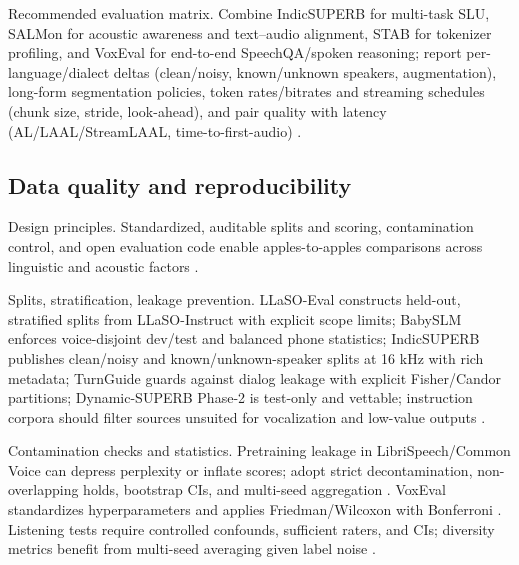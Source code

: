 \documentclass{article}
\begin{document}
Recommended evaluation matrix. Combine IndicSUPERB for multi-task SLU, SALMon for acoustic awareness and text--audio alignment, STAB for tokenizer profiling, and VoxEval for end-to-end SpeechQA/spoken reasoning; report per-language/dialect deltas (clean/noisy, known/unknown speakers, augmentation), long-form segmentation policies, token rates/bitrates and streaming schedules (chunk size, stride, look-ahead), and pair quality with latency (AL/LAAL/StreamLAAL, time-to-first-audio) \cite{entry2025indicsuperbspeechprocessinguniversalperf,maimon2025salmonsuiteacousticlanguagemodelevaluati,vashishth2024stabspeechtokenizerassessmentbenchmark,cui2025voxevalbenchmarkingknowledgeunderstandin,zhang2025impactframeratesspeechtokenizercasestudy}.

\subsection{Data quality and reproducibility} \label{subsec:dataqualityandreproducibility}

Design principles. Standardized, auditable splits and scoring, contamination control, and open evaluation code enable apples-to-apples comparisons across linguistic and acoustic factors \cite{entry2025indicsuperbspeechprocessinguniversalperf,maimon2025salmonsuiteacousticlanguagemodelevaluati}.

Splits, stratification, leakage prevention. LLaSO-Eval constructs held-out, stratified splits from LLaSO-Instruct with explicit scope limits; BabySLM enforces voice-disjoint dev/test and balanced phone statistics; IndicSUPERB publishes clean/noisy and known/unknown-speaker splits at 16 kHz with rich metadata; TurnGuide guards against dialog leakage with explicit Fisher/Candor partitions; Dynamic-SUPERB Phase-2 is test-only and vettable; instruction corpora should filter sources unsuited for vocalization and low-value outputs \cite{sun2025llasofoundationalframeworkreproduciblere,lavechin2023babyslmlanguageacquisitionfriendlybenchm,cui2025thinkbeforeyoutalkenhancingmeaningfuldia,huang2025dynamicsuperbphase2collaborativelyexpand,shu2023llasmlargelanguagespeechmodel}.

Contamination checks and statistics. Pretraining leakage in LibriSpeech/Common Voice can depress perplexity or inflate scores; adopt strict decontamination, non-overlapping holds, bootstrap CIs, and multi-seed aggregation \cite{tseng2025evaluationllmsspeechisoftenflawedtestset}. VoxEval standardizes hyperparameters and applies Friedman/Wilcoxon with Bonferroni \cite{cui2025voxevalbenchmarkingknowledgeunderstandin}. Listening tests require controlled confounds, sufficient raters, and CIs; diversity metrics benefit from multi-seed averaging given label noise \cite{wang2024evaluatingtextspeechsynthesislargediscre,futeral2025madspeechmeasuresacousticdiversity}.
\end{document}
